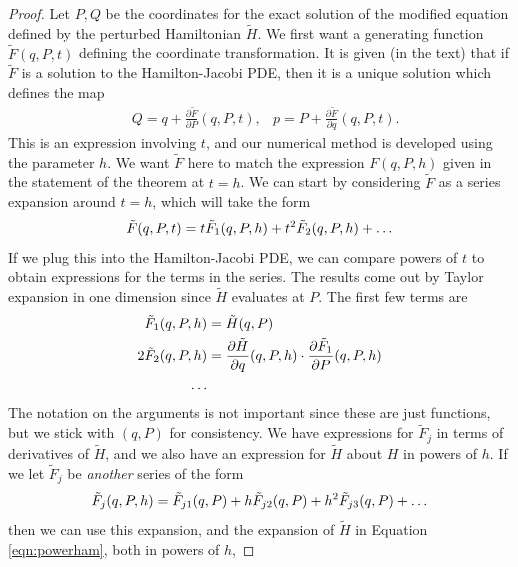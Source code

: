 \documentclass{report}
\theoremstyle{exampstyle} \newtheorem{example}[theorem]{Example}
\theoremstyle{exampstyle} \newtheorem{remark}[theorem]{Remark}
\theoremstyle{exampstyle} \newtheorem{definition}[theorem]{Definition}
\theoremstyle{exampstyle} \newtheorem{lemma}[theorem]{Lemma}
\theoremstyle{exampstyle} \newtheorem{proposition}[theorem]{Proposition}
\begin{document}
\begin{proof}
	Let $P,Q$ be the coordinates for the exact solution of the modified equation defined by the perturbed Hamiltonian $\tilde{H}$.
	We first want a generating function $\tilde{F}(q,P,t)$ defining the coordinate transformation.
	It is given (in the text) that if $\tilde{F}$ is a solution to the Hamilton-Jacobi PDE, then it is a unique solution which defines the map
	\begin{align*}
		&Q = q + \frac{\partial \tilde{F}}{\partial P}(q,P,t), &p = P + \frac{\partial \tilde{F}}{\partial q}(q,P,t).
	\end{align*}
	This is an expression involving $t$, and our numerical method is developed using the parameter $h$.
	We want $\tilde{F}$ here to match the expression $F(q,P,h)$ given in the statement of the theorem at $t=h$.
	We can start by considering $\tilde{F}$ as a series expansion around $t=h$, which will take the form
	\begin{equation*}
		\tilde{F}(q,P,t) = t \tilde{F}_1 (q,P,h) + t^2 \tilde{F}_2 (q,P,h) + \mathellipsis
	\end{equation*}
	If we plug this into the Hamilton-Jacobi PDE, we can compare powers of $t$ to obtain expressions for the terms in the series.
	The results come out by Taylor expansion in one dimension since $\tilde{H}$ evaluates at $P$.
	The first few terms are
	\begin{equation}
		\begin{aligned}
			\tilde{F}_1(q,P,h) &= \tilde{H}(q,P) \\
			2 \tilde{F}_2(q,P,h) &= \frac{\partial \tilde{H}}{\partial q}(q,P,h) \cdot \frac{\partial \tilde{F}_1}{\partial P}(q,P,h) \\
			\mathellipsis
		\end{aligned}
		\label{eqn:genh}
	\end{equation}
	The notation on the arguments is not important since these are just functions,
	but we stick with $(q,P)$ for consistency.
	We have expressions for $\tilde{F}_j$ in terms of derivatives of $\tilde{H}$,
	and we also have an expression for $\tilde{H}$ about $H$ in powers of $h$.
	If we let $\tilde{F}_j$ be \textit{another} series of the form
	\begin{equation*}
		\tilde{F}_j(q,P,h) = \tilde{F}_{j1}(q,P) + h \tilde{F}_{j2}(q,P) + h^2\tilde{F}_{j3}(q,P) + \mathellipsis
	\end{equation*}
	then we can use this expansion, and the expansion of $\tilde{H}$ in Equation \ref{eqn:powerham},
	both in powers of $h$,

\end{proof}
\end{document}
